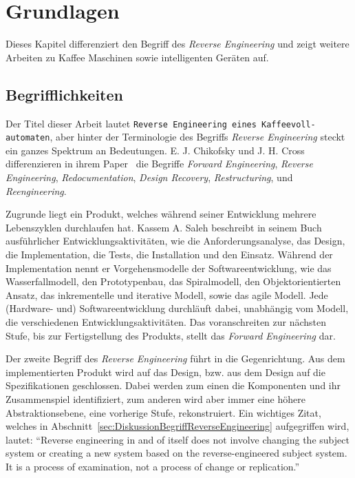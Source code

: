 \chapter{Grundlagen}
Dieses Kapitel differenziert den Begriff des \textit{Reverse Engineering} und zeigt weitere Arbeiten zu Kaffee Maschinen sowie intelligenten Geräten auf.

\section{Begrifflichkeiten}\label{sec:Begrifflichkeiten}
Der Titel dieser Arbeit lautet \texttt{Reverse Engineering eines Kaffeevoll-\\automaten}, aber hinter der Terminologie des Begriffs \textit{Reverse Engineering} steckt ein ganzes Spektrum an Bedeutungen.
E. J. Chikofsky und J. H. Cross differenzieren in ihrem Paper~\cite{43044} die Begriffe \textit{Forward Engineering}, \textit{Reverse Engineering}, \textit{Redocumentation}, \textit{Design Recovery}, \textit{Restructuring}, und \textit{Reengineering}.

Zugrunde liegt ein Produkt, welches während seiner Entwicklung mehrere Lebenszyklen durchlaufen hat.
Kassem A. Saleh beschreibt in seinem Buch~\cite{Solr-599853700} ausführlicher Entwicklungsaktivitäten, wie die Anforderungsanalyse, das Design, die Implementation, die Tests, die Installation und den Einsatz.
Während der Implementation nennt er Vorgehensmodelle der Softwareentwicklung, wie das Wasserfallmodell, den Prototypenbau, das Spiralmodell, den Objektorientierten Ansatz, das inkrementelle und iterative Modell, sowie das agile Modell.
Jede (Hardware- und) Softwareentwicklung durchläuft dabei, unabhängig vom Modell, die verschiedenen Entwicklungsaktivitäten.
Das voranschreiten zur nächsten Stufe, bis zur Fertigstellung des Produkts, stellt das \textit{Forward Engineering} dar.

Der zweite Begriff des \textit{Reverse Engineering} führt in die Gegenrichtung.
Aus dem implementierten Produkt wird auf das Design, bzw. aus dem Design auf die Spezifikationen geschlossen.
Dabei werden zum einen die Komponenten und ihr Zusammenspiel identifiziert, zum anderen wird aber immer eine höhere Abstraktionsebene, eine vorherige Stufe, rekonstruiert.
Ein wichtiges Zitat, welches in Abschnitt~\ref{sec:DiskussionBegriffReverseEngineering}  aufgegriffen wird, lautet: "`Reverse engineering in and of itself does not involve changing the subject system or creating a new system based on the reverse-engineered subject system.
It is a process of examination, not a process of change or replication."'\cite{43044}

